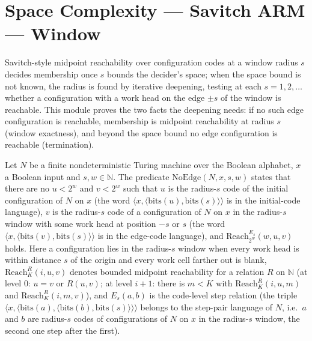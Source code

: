 \section{Space Complexity --- Savitch ARM --- Window}
Savitch-style midpoint reachability over configuration codes at a window radius $s$ decides
membership once $s$ bounds the decider's space; when the space bound is not known, the radius is
found by iterative deepening, testing at each $s=1,2,\dots$ whether a configuration with a work
head on the edge $\pm s$ of the window is reachable. This module proves the two facts the
deepening needs: if no such edge configuration is reachable, membership is midpoint
reachability at radius $s$ (window exactness), and beyond the space bound no edge configuration
is reachable (termination).

\begin{definition}
\label{Complexity.LogProg.SavitchARM.NoEdge}
\leanok
{}
Let $N$ be a finite nondeterministic Turing machine over the Boolean alphabet, $x$ a Boolean
input and $s,w\in\mathbb N$. The predicate $\mathrm{NoEdge}(N,x,s,w)$ states that there are no
$u<2^w$ and $v<2^w$ such that $u$ is the radius-$s$ code of the initial configuration of $N$ on
$x$ (the word $\langle x,\langle\mathrm{bits}(u),\mathrm{bits}(s)\rangle\rangle$ is in the
initial-code language), $v$ is the radius-$s$ code of a configuration of $N$ on $x$ in the
radius-$s$ window with some work head at position $-s$ or $s$ (the word
$\langle x,\langle\mathrm{bits}(v),\mathrm{bits}(s)\rangle\rangle$ is in the edge-code language),
and $\mathrm{Reach}_{2^w}^{E_s}(w,u,v)$ holds. Here a configuration lies in the radius-$s$ window when every work head is within distance $s$ of the origin and every work cell farther out is blank, $\mathrm{Reach}_K^R(i,u,v)$ denotes bounded midpoint reachability for a relation $R$ on $\mathbb N$ (at level $0$: $u=v$ or $R(u,v)$; at level $i+1$: there is $m<K$ with $\mathrm{Reach}_K^R(i,u,m)$ and $\mathrm{Reach}_K^R(i,m,v)$), and $E_s(a,b)$ is the code-level step relation (the triple $\langle x,\langle\mathrm{bits}(a),\langle\mathrm{bits}(b),\mathrm{bits}(s)\rangle\rangle\rangle$ belongs to the step-pair language of $N$, i.e.\ $a$ and $b$ are radius-$s$ codes of configurations of $N$ on $x$ in the radius-$s$ window, the second one step after the first).
\end{definition}


